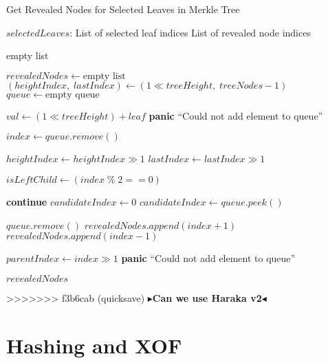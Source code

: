 \documentclass[twoside,11pt]{report}
\theoremstyle{definition}
\theoremstyle{plain}
\newcommand{\todo}[1]{{\color[rgb]{.5,0,0}\textbf{$\blacktriangleright$#1$\blacktriangleleft$}}}
\begin{document}
\begin{algorithm}
  \caption{Get Revealed Nodes for Selected Leaves in Merkle Tree}
  \begin{algorithmic}[1]
    \Require $selectedLeaves$: List of selected leaf indices
    \Ensure List of revealed node indices

    \State \Return empty list
    \EndIf

    \State $revealedNodes \gets \text{empty list}$
    \State $(heightIndex,\; lastIndex) \gets (1 \ll treeHeight,\; treeNodes - 1)$
    \State $queue \gets \text{empty queue}$


     
    \State $val \gets (1 \ll treeHeight) + leaf$
    \State \textbf{panic} ``Could not add element to queue''
    \EndIf
    \EndFor

     
    \State $index \gets queue.remove()$

    \State $heightIndex \gets heightIndex \gg 1$
    \State $lastIndex \gets lastIndex \gg 1$
    \EndIf

    \State $isLeftChild \gets (index \; \% \; 2 == 0)$

    \State \textbf{continue}
    \Else
    \State $candidateIndex \gets 0$
    \State $candidateIndex \gets queue.peek()$
    \EndIf

    \State $queue.remove()$
    \State $revealedNodes.append(index + 1)$
    \Else
    \State $revealedNodes.append(index - 1)$
    \EndIf
    \EndIf

    \State $parentIndex \gets index \gg 1$
    \State \textbf{panic} ``Could not add element to queue''
    \EndIf
    \EndWhile

    \State \Return $revealedNodes$
    \EndFunction

  \end{algorithmic}
\end{algorithm}

>>>>>>> f3b6cab (quicksave)
\todo{Can we use Haraka v2}

\section{Hashing and XOF}
\end{document}
